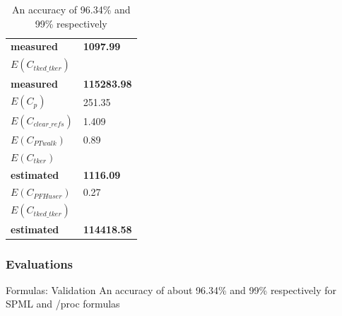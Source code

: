\documentclass[xcolor=table,bigger,unknownkeysallowed]{beamer}
\begin{document}
\begin{frame}
\begin{table}[h]
\begin{subtable}[b]{.45\textwidth}
\begin{tabular}{l l}
						\textcolor{americanrose}{\textbf{measured}} & \multirow{-2}{*}{\textcolor{americanrose}{\textbf{1097.99}}}\\
						\textcolor{airforceblue}{\textbf{$E(C_{tked\_tker})$}} & \\
						\textcolor{airforceblue}{\textbf{measured}} & \multirow{-2}{*}{\textcolor{airforceblue}{\textbf{115283.98}}}\\
						\midrule
						$E(C_{p})$ & 251.35\\
						$E(C_{clear\_refs})$ & 1.409\\
						$E(C_{PT walk})$ & 0.89\\
						\textcolor{americanrose}{\textbf{$E(C_{tker})$}}  & \\
						\textcolor{americanrose}{\textbf{estimated}} & \multirow{-2}{*}{\textcolor{americanrose}{\textbf{1116.09}}}\\
						\midrule
						$E(C_{PFH user})$ & 0.27\\
						\textcolor{airforceblue}{\textbf{$E(C_{tked\_tker})$}}  &\\
						\textcolor{airforceblue}{\textbf{estimated}} &  \multirow{-2}{*}{\textcolor{airforceblue}{\textbf{114418.58}}}\\
						\bottomrule
					\end{tabular}
					\label{tab:criu-proc-formula}
				\end{subtable}
				\vspace{.3cm}
				\caption{An accuracy of 96.34\% and 99\% respectively}
				\vspace{.3cm}
			\end{table}
        \end{frame}  
        \begin{frame}
			\frametitle{Evaluations}
			\begin{block}{Formulas: Validation}
				An accuracy of about 96.34\% and 99\% respectively for SPML and /proc formulas
			\end{block}
        \end{frame}                 
\end{document}
